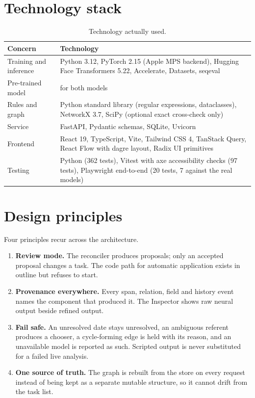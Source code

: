 \section{Technology stack}
\begin{table}[h]
\centering
\caption{Technology actually used.}
\label{tab:stack}
\footnotesize
\begin{tabularx}{\linewidth}{@{}p{30mm}L@{}}
\toprule
Concern & Technology \\
\midrule
Training and inference & Python 3.12, PyTorch 2.15 (Apple MPS backend), Hugging Face Transformers 5.22, Accelerate, Datasets, seqeval \\
Pre-trained model &  for both models \\
Rules and graph & Python standard library (regular expressions, dataclasses), NetworkX 3.7, SciPy (optional exact cross-check only) \\
Service & FastAPI, Pydantic schemas, SQLite, Uvicorn \\
Frontend & React 19, TypeScript, Vite, Tailwind CSS 4, TanStack Query, React Flow with dagre layout, Radix UI primitives \\
Testing & Python  (362 tests), Vitest with axe accessibility checks (97 tests), Playwright end-to-end (20 tests, 7 against the real models) \\
\bottomrule
\end{tabularx}
\end{table}

\section{Design principles}
Four principles recur across the architecture.
\begin{enumerate}
  \item \textbf{Review mode.} The reconciler produces proposals; only an accepted proposal changes a task. The code path for automatic application exists in outline but refuses to start.
  \item \textbf{Provenance everywhere.} Every span, relation, field and history event names the component that produced it. The Inspector shows raw neural output beside refined output.
  \item \textbf{Fail safe.} An unresolved date stays unresolved, an ambiguous referent produces a chooser, a cycle-forming edge is held with its reason, and an unavailable model is reported as such. Scripted output is never substituted for a failed live analysis.
  \item \textbf{One source of truth.} The graph is rebuilt from the store on every request instead of being kept as a separate mutable structure, so it cannot drift from the task list.
\end{enumerate}
